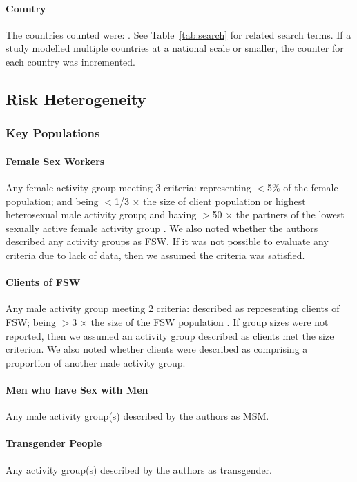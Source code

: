 \paragraph{Country}
The countries counted were: \emph{\countrylist}.
See Table~\ref{tab:search} for related search terms.
If a study modelled multiple countries at a national scale or smaller,
the counter for each country was incremented.
\subsection{Risk Heterogeneity}
\label{aa:defs:risk}
\subsubsection{Key Populations}
\label{aaa:defs:kp}
\paragraph{Female Sex Workers}
Any female activity group meeting 3 criteria:
representing {$<$5\%} of the female population; and
being {$<$1/3 $\times$} the size of client population or highest heterosexual male activity group; and
having {$>$50 $\times$} the partners of the lowest sexually active female activity group
\cite{Vandepitte2006,Carael2006,Scorgie2012}.
We also noted whether the authors described any activity groups as FSW.
If it was not possible to evaluate any criteria due to lack of data,
then we assumed the criteria was satisfied.
\paragraph{Clients of FSW}
Any male activity group meeting 2 criteria:
described as representing clients of FSW;
being {$>$3 $\times$} the size of the FSW population \cite{Carael2006}.
If group sizes were not reported,
then we assumed an activity group described as clients met the size criterion.
We also noted whether clients were described as
comprising a proportion of another male activity group.
\paragraph{Men who have Sex with Men}
Any male activity group(s) described by the authors as MSM.
\paragraph{Transgender People}
Any activity group(s) described by the authors as transgender.
